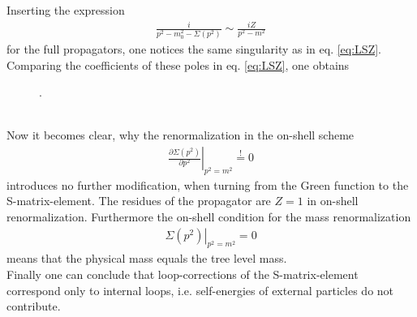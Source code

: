 Inserting the expression
\begin{align}
\frac{i}{p^2 - m_0^2 - \Sigma(p^2)} \sim \frac{i Z}{p^2 - m^2}
\end{align}
for the full propagators, one notices the same singularity as in eq. \eqref{eq:LSZ}. Comparing the coefficients of these poles in eq. \eqref{eq:LSZ}, one obtains
\begin{figure}[!htbp]
\begin{center}
.
\end{center}
\end{figure}\\
Now it becomes clear, why the renormalization in the on-shell scheme
\begin{align}
\left.\frac{\partial \Sigma(p^2)}{\partial p^2}\right|_{p^2 = m^2} \stackrel{!}{=} 0
\end{align}
introduces no further modification, when turning from the Green function to the S-matrix-element. The residues of the propagator are $Z = 1$ in on-shell renormalization. Furthermore the on-shell condition for the mass renormalization
\begin{align}
\left.\Sigma(p^2)\right|_{p^2 = m^2} = 0
\end{align}
means that the physical mass equals the tree level mass.\\
Finally one can conclude that loop-corrections of the S-matrix-element correspond only to internal loops, i.e. self-energies of external particles do not contribute.%

